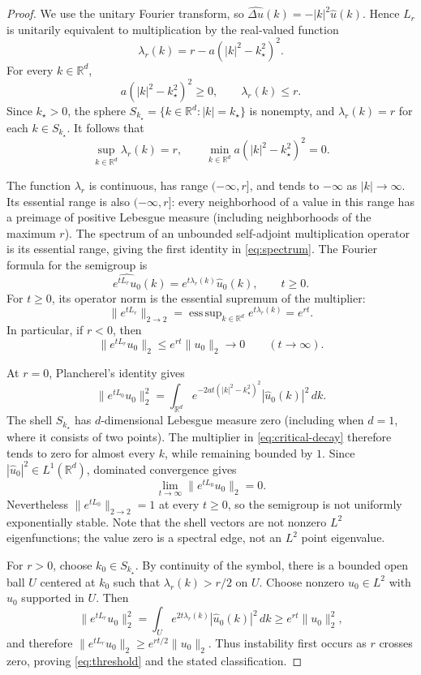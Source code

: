 \documentclass[11pt]{article}
\DeclareMathOperator{\esssup}{ess\,sup}
\newcommand{\R}{\mathbb{R}}
\begin{document}
\begin{proof}
We use the unitary Fourier transform, so
$\widehat{\Delta u}(k)=-|k|^2\widehat u(k)$. Hence $L_r$ is unitarily
equivalent to multiplication by the real-valued function
\begin{equation}\label{eq:symbol}
\lambda_r(k)=r-a(|k|^2-k_\star^2)^2.
\end{equation}
For every $k\in\R^d$,
\[
a(|k|^2-k_\star^2)^2\ge0,
\qquad\lambda_r(k)\le r.
\]
Since $k_\star>0$, the sphere
$S_{k_\star}=\{k\in\R^d:|k|=k_\star\}$ is nonempty, and
$\lambda_r(k)=r$ for each $k\in S_{k_\star}$. It follows that
\begin{equation}\label{eq:extremum}
\sup_{k\in\R^d}\lambda_r(k)=r,
\qquad \min_{k\in\R^d}a(|k|^2-k_\star^2)^2=0.
\end{equation}

The function $\lambda_r$ is continuous, has range $(-\infty,r]$, and
tends to $-\infty$ as $|k|\to\infty$. Its essential range is also
$(-\infty,r]$: every neighborhood of a value in this range has a
preimage of positive Lebesgue measure (including neighborhoods of the
maximum $r$). The spectrum of an unbounded self-adjoint multiplication
operator is its essential range, giving the first identity in
\eqref{eq:spectrum}. The Fourier formula for the semigroup is
\begin{equation}\label{eq:semigroup}
\widehat{e^{tL_r}u_0}(k)
=e^{t\lambda_r(k)}\widehat u_0(k), \qquad t\ge0.
\end{equation}
For $t\ge0$, its operator norm is the essential supremum of the
multiplier:
\[
\|e^{tL_r}\|_{2\to2}
=\esssup_{k\in\R^d}e^{t\lambda_r(k)}=e^{rt}.
\]
In particular, if $r<0$, then
\[
\|e^{tL_r}u_0\|_2\le e^{rt}\|u_0\|_2\longrightarrow0
\qquad(t\to\infty).
\]

At $r=0$, Plancherel's identity gives
\begin{equation}\label{eq:critical-decay}
\|e^{tL_0}u_0\|_2^2
=\int_{\R^d}
 e^{-2at(|k|^2-k_\star^2)^2}|\widehat u_0(k)|^2\,dk.
\end{equation}
The shell $S_{k_\star}$ has $d$-dimensional Lebesgue measure zero
(including when $d=1$, where it consists of two points). The multiplier
in \eqref{eq:critical-decay} therefore tends to zero for almost every
$k$, while remaining bounded by $1$. Since
$|\widehat u_0|^2\in L^1(\R^d)$, dominated convergence gives
\[
\lim_{t\to\infty}\|e^{tL_0}u_0\|_2=0.
\]
Nevertheless $\|e^{tL_0}\|_{2\to2}=1$ at every $t\ge0$,
so the semigroup is not uniformly exponentially stable. Note that
the shell vectors are not nonzero $L^2$ eigenfunctions; the value zero
is a spectral edge, not an $L^2$ point eigenvalue.

For $r>0$, choose $k_0\in S_{k_\star}$. By continuity of the symbol,
there is a bounded open ball $U$ centered at $k_0$ such that
$\lambda_r(k)>r/2$ on $U$. Choose nonzero $u_0\in L^2$ with
$\widehat u_0$ supported in $U$. Then
\[
\|e^{tL_r}u_0\|_2^2
=\int_U e^{2t\lambda_r(k)}|\widehat u_0(k)|^2\,dk
\ge e^{rt}\|u_0\|_2^2,
\]
and therefore $\|e^{tL_r}u_0\|_2\ge e^{rt/2}\|u_0\|_2$.
Thus instability first occurs as $r$ crosses zero, proving
\eqref{eq:threshold} and the stated classification.
\end{proof}
\end{document}
